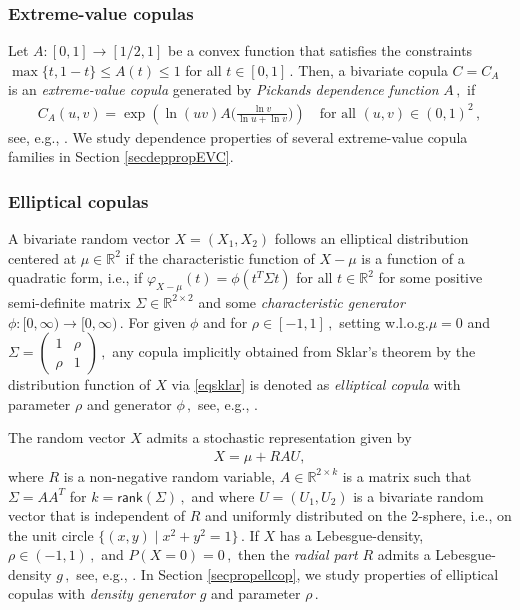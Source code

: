 \documentclass{article}
\newcommand{\R}{\mathbb{R}}
\newcommand{\rank}{\mathsf{rank}}
\begin{document}
\subsubsection{Extreme-value copulas}
\label{subsubsec:EVC}

Let \(A\colon [0,1]\to [1/2,1]\) be a convex function that satisfies the constraints \(\max\{t,1-t\}\leq A(t)\leq 1\) for all \(t\in [0,1]\,.\)
Then, a bivariate copula \(C = C_A\) is an \emph{extreme-value copula} generated by \emph{Pickands dependence function} \(A\,,\) if
\begin{align}\label{defEVC}
    C_A(u,v)=\exp\left( \ln(uv) A\Big(\frac{\ln v}{\ln u + \ln v}\Big) \right) \quad\text{for all } (u,v)\in (0,1)^2\,,
\end{align}
see, e.g., \cite[Theorem 6.6.7]{Durante-2016}.
We study dependence properties of several extreme-value copula families in Section \ref{secdeppropEVC}.


\subsubsection{Elliptical copulas}
\label{subsubsec:elliptical}

A bivariate random vector \(X=(X_1,X_2)\) follows an elliptical distribution centered at \(\mu\in \R^2\) if the characteristic function of \(X-\mu\) is a function of a quadratic form, i.e., if \(\varphi_{X-\mu}(t) = \phi(t^T\Sigma t)\) for all \(t\in \R^2\) for some positive semi-definite matrix \(\Sigma\in \R^{2\times 2}\) and some \emph{characteristic generator} \(\phi\colon [0,\infty)\to [0,\infty)\,.\)
For given \(\phi\) and for \(\rho\in [-1,1]\,,\) setting w.l.o.g.\@ \(\mu=0\) and \(\Sigma = \left(\begin{smallmatrix}
    1 & \rho \\
    \rho & 1
\end{smallmatrix}\right)\,,\)
any copula implicitly obtained from Sklar's theorem by the distribution function of \(X\) via \eqref{eqsklar} is denoted as \emph{elliptical copula} with parameter \(\rho\) and generator \(\phi\,,\) see, e.g., \cite[Section 6.7]{Durante-2016}.

The random vector \(X\) admits a stochastic representation given by
\begin{align*}
    X = \mu + R A U
,\end{align*}
where \(R\) is a non-negative random variable, \(A\in \R^{2\times k}\) is a matrix such that \(\Sigma = AA^T\) for \(k=\rank(\Sigma)\,,\) and where \(U =(U_1,U_2)\) is a bivariate random vector that is independent of \(R\) and uniformly distributed on the \(2\)-sphere, i.e., on the unit circle \(\{(x,y)\mid x^2+y^2=1\}\,.\)
If \(X\) has a Lebesgue-density, \(\rho\in (-1,1)\,,\) and \(P(X=0)=0\,,\) then the \emph{radial part} \(R\) admits a Lebesgue-density \(g\,,\) see, e.g., \cite[Section 2.6]{Fang-1990}.
In Section \ref{secpropellcop}, we study properties of elliptical copulas with \emph{density generator} \(g\) and parameter \(\rho\,.\)
\end{document}
